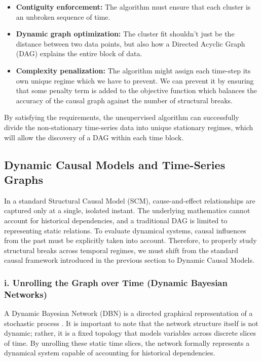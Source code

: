 \begin{itemize}
    \item \textbf{Contiguity enforcement:} The algorithm must ensure that each cluster is an unbroken sequence of time. 
    \item \textbf{Dynamic graph optimization:} The cluster fit shouldn't just be the distance between two data points, but also how a Directed Acyclic Graph (DAG) explains the entire block of data. 
    \item \textbf{Complexity penalization:} The algorithm might assign each time-step its own unique regime which we have to prevent. We can prevent it by ensuring that some penalty term is added to the objective function which balances the accuracy of the causal graph against the number of structural breaks. 
\end{itemize}

By satisfying the requirements, the unsupervised algorithm can successfully divide the non-stationary time-series data into unique stationary regimes, which will allow the discovery of a DAG within each time block.


\subsection{Dynamic Causal Models and Time-Series Graphs}

In a standard Structural Causal Model (SCM), cause-and-effect relationships are captured only at a single, isolated instant. The underlying mathematics cannot account for historical dependencies, and a traditional DAG is limited to representing static relations. To evaluate dynamical systems, causal influences from the past must be explicitly taken into account. Therefore, to properly study structural breaks across temporal regimes, we must shift from the standard causal framework introduced in the previous section to Dynamic Causal Models.

\subsubsection*{i. Unrolling the Graph over Time (Dynamic Bayesian Networks)}

A Dynamic Bayesian Network (DBN) is a directed graphical representation of a stochastic process \cite{murphy2012}. It is important to note that the network structure itself is not dynamic; rather, it is a fixed topology that models variables across discrete slices of time. By unrolling these static time slices, the network formally represents a dynamical system capable of accounting for historical dependencies. 

